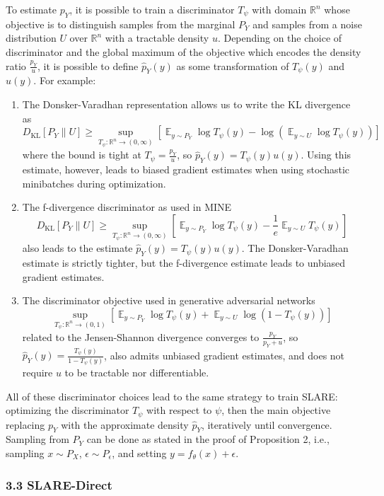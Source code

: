 \documentclass{NSF}
\newcommand{\E} {
    \mathop{\mathbb{E}}
}
\newcommand{\DKL} {
    D_{\mathrm{KL}}
}
\begin{document}
To estimate $p_Y$, it is possible to train a discriminator
$T_\psi$ with domain $\mathbb{R}^n$ whose objective is to distinguish samples from
the marginal $P_Y$ and samples from a noise distribution $U$ over $\mathbb{R}^n$ with a tractable density $u$.
Depending on the choice of discriminator and the global maximum of the objective which encodes the density ratio $\frac{p_Y}{u}$, it is
possible to define $\hat{p}_Y(y)$ as some transformation of $T_\psi(y)$ and $u(y)$. For
example:
\begin{enumerate}
\item The Donsker-Varadhan representation \citep{donsker1975asymptotic} allows us to write the KL divergence as
\[
  \DKL[P_Y \| U] \geq \sup_{T_\psi: \mathbb{R}^n \rightarrow (0,\infty)} \left[
    \E_{y\sim P_Y} \log T_\psi(y) - \log\left(\E_{y\sim U} \log T_\psi(y)\right)
  \right]
\]
where the bound is tight at $T_\psi = \frac{p_Y}{u}$, so $\hat{p}_Y(y) = T_\psi(y) u(y)$. Using this estimate, however, leads to biased gradient estimates when using stochastic minibatches during optimization.
\item The f-divergence discriminator as used in MINE \citep{belghazi2018mine}
\[
  \DKL[P_Y \| U] \geq \sup_{T_\psi: \mathbb{R}^n \rightarrow (0,\infty)} \left[
    \E_{y\sim P_Y} \log T_\psi(y) - \frac{1}{e}\E_{y\sim U} T_\psi(y)
  \right]
\]
also leads to the estimate $\hat{p}_Y(y) = T_\psi(y) u(y)$. The Donsker-Varadhan estimate is
strictly tighter, but the f-divergence estimate leads to unbiased gradient estimates.
\item The discriminator objective used in generative adversarial networks \citep{goodfellow2014generative}
\[
  \sup_{T_\psi: \mathbb{R}^n \rightarrow (0,1)} \left[
    \E_{y\sim P_Y} \log T_\psi(y) + \E_{y\sim U} \log (1 - T_\psi(y))
  \right]
\]
related to the Jensen-Shannon divergence converges to $\frac{p_Y}{p_Y + u}$, so $\hat{p}_Y(y) = \frac{T_\psi(y)}{1-T_\psi(y)}$, also admits unbiased gradient estimates, and does not require $u$ to be tractable nor differentiable.
\end{enumerate}
All of these discriminator choices lead to the same strategy to train SLARE: optimizing the discriminator $T_\psi$ with respect to $\psi$, then the main objective replacing $p_Y$ with the approximate density $\hat{p}_Y$, iteratively until convergence. Sampling from
$P_Y$ can be done as stated in the proof of Proposition 2, i.e., sampling $x\sim P_X$,
$\epsilon\sim P_\epsilon$, and setting $y=f_\theta(x)+\epsilon$.

\subsubsection{3.3 SLARE-Direct}
\end{document}
